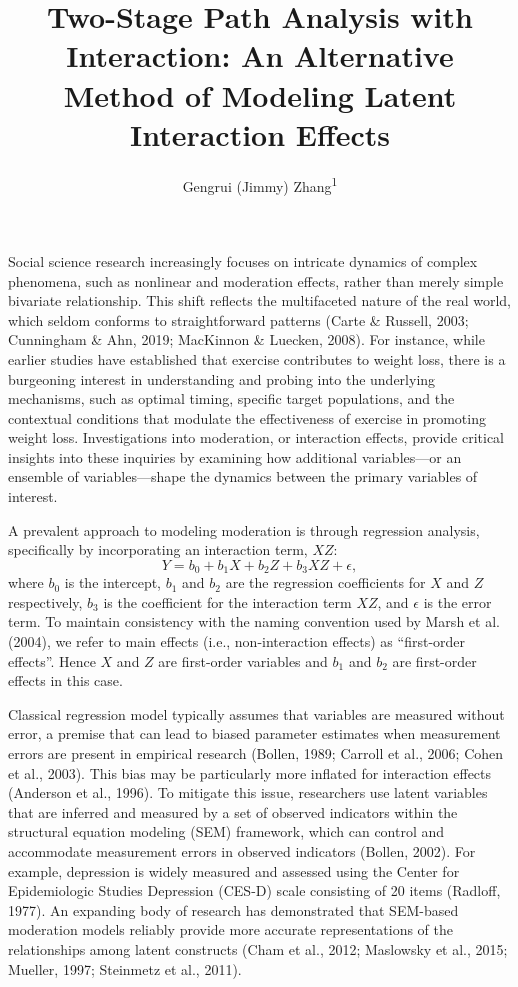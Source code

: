 \documentclass[
  man]{apa6}
\title{Two-Stage Path Analysis with Interaction: An Alternative Method of Modeling Latent Interaction Effects}
\author{Gengrui (Jimmy) Zhang\textsuperscript{1}}
\date{}
\affiliation{\vspace{0.5cm}\textsuperscript{1} University of Southhern California}
\begin{document}
\maketitle

Social science research increasingly focuses on intricate dynamics of complex phenomena, such as nonlinear and moderation effects, rather than merely simple bivariate relationship. This shift reflects the multifaceted nature of the real world, which seldom conforms to straightforward patterns (Carte \& Russell, 2003; Cunningham \& Ahn, 2019; MacKinnon \& Luecken, 2008). For instance, while earlier studies have established that exercise contributes to weight loss, there is a burgeoning interest in understanding and probing into the underlying mechanisms, such as optimal timing, specific target populations, and the contextual conditions that modulate the effectiveness of exercise in promoting weight loss. Investigations into moderation, or interaction effects, provide critical insights into these inquiries by examining how additional variables---or an ensemble of variables---shape the dynamics between the primary variables of interest.

A prevalent approach to modeling moderation is through regression analysis, specifically by incorporating an interaction term, \(XZ\):
\begin{equation}
Y = b_{0} + b_{1}X + b_{2}Z + b_{3}XZ + \epsilon,
\end{equation}
where \(b_{0}\) is the intercept, \(b_{1}\) and \(b_{2}\) are the regression coefficients for \(X\) and \(Z\) respectively, \(b_{3}\) is the coefficient for the interaction term \(XZ\), and \(\epsilon\) is the error term. To maintain consistency with the naming convention used by Marsh et al. (2004), we refer to main effects (i.e., non-interaction effects) as ``first-order effects''. Hence \(X\) and \(Z\) are first-order variables and \(b_{1}\) and \(b_{2}\) are first-order effects in this case.

Classical regression model typically assumes that variables are measured without error, a premise that can lead to biased parameter estimates when measurement errors are present in empirical research (Bollen, 1989; Carroll et al., 2006; Cohen et al., 2003). This bias may be particularly more inflated for interaction effects (Anderson et al., 1996). To mitigate this issue, researchers use latent variables that are inferred and measured by a set of observed indicators within the structural equation modeling (SEM) framework, which can control and accommodate measurement errors in observed indicators (Bollen, 2002). For example, depression is widely measured and assessed using the Center for Epidemiologic Studies Depression (CES-D) scale consisting of 20 items (Radloff, 1977). An expanding body of research has demonstrated that SEM-based moderation models reliably provide more accurate representations of the relationships among latent constructs (Cham et al., 2012; Maslowsky et al., 2015; Mueller, 1997; Steinmetz et al., 2011).
\end{document}
